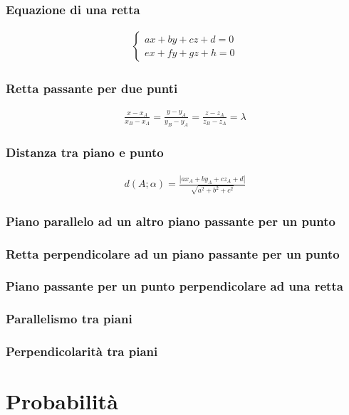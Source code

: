\documentclass[a4paper]{article}
\begin{document}
	\subsubsection*{Equazione di una retta}
	\begin{align*}
		\begin{cases}
		ax+by+cz+d=0\\
		ex+fy+gz+h=0
		\end{cases}
	\end{align*}

	\subsubsection*{Retta passante per due punti}
	\begin{align*}
		\frac{x - x_A}{x_B - x_A} = \frac{y - y_A}{y_B - y_A} = \frac{z - z_A}{z_B - z_A} = \lambda
	\end{align*}

	\subsubsection*{Distanza tra piano e punto}
	\begin{align*}
		d(A ; \alpha) = \frac{|ax_A + by_A + cz_A + d|}{\sqrt{a^2+b^2+c^2}}
	\end{align*}
	
	\subsubsection*{Piano parallelo ad un altro piano passante per un punto}
	\subsubsection*{Retta perpendicolare ad un piano passante per un punto}
	\subsubsection*{Piano passante per un punto perpendicolare ad una retta}
	\subsubsection*{Parallelismo tra piani}
	\subsubsection*{Perpendicolarità tra piani}
	
	\newpage
	\section{Probabilità}
	\newpage
\end{document}
